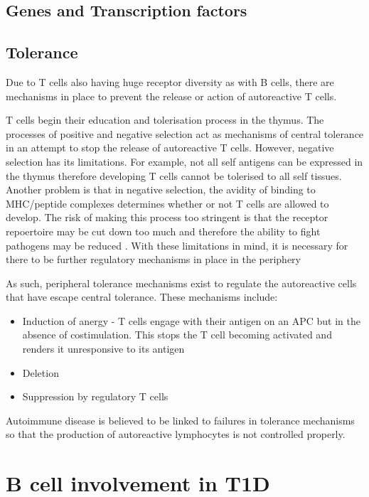 \subsection{Genes and Transcription factors}
\subsection{Tolerance}

Due to T cells also having huge receptor diversity as with B cells, there are mechanisms in place to prevent the release or action of autoreactive T cells.

T cells begin their education and tolerisation process in the thymus.
The processes of positive and negative selection act as mechanisms of central tolerance in an attempt to stop the release of autoreactive T cells\citep{Walker2002}.
However, negative selection has its limitations.
For example, not all self antigens can be expressed in the thymus therefore developing T cells cannot be tolerised to all self tissues.
Another problem is that in negative selection, the avidity of binding to MHC/peptide complexes determines whether or not T cells are allowed to develop.
The risk of making this process too stringent is that the receptor repoertoire may be cut down too much and therefore the ability to fight pathogens may be reduced \citep{Walker2002}.
With these limitations in mind, it is necessary for there to be further regulatory mechanisms in place in the periphery

As such, peripheral tolerance mechanisms exist to regulate the autoreactive cells that have escape central tolerance.
These mechanisms include:
\begin{itemize}
\item Induction of anergy - T cells engage with their antigen on an APC but in the absence of costimulation. This stops the T cell becoming activated and renders it unresponsive to its antigen\citep{Abbas2004}
\item Deletion\citep{Abbas2004}
\item Suppression by regulatory T cells\citep{Abbas2004}
\end{itemize}

Autoimmune disease is believed to be linked to failures in tolerance mechanisms so that the production of autoreactive lymphocytes is not controlled properly.



\section{B cell involvement in T1D}
\label{sec:BcellsinT1D}
